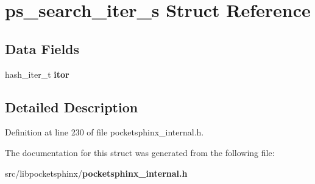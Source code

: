\section{ps\-\_\-search\-\_\-iter\-\_\-s Struct Reference}
\label{structps__search__iter__s}
\subsection*{Data Fields}
\begin{DoxyCompactItemize}
\item 
hash\-\_\-iter\-\_\-t {\bfseries itor}\label{structps__search__iter__s_a08c98d4145043af325263a80020758f7}

\end{DoxyCompactItemize}


\subsection{Detailed Description}


Definition at line 230 of file pocketsphinx\-\_\-internal.\-h.



The documentation for this struct was generated from the following file\-:\begin{DoxyCompactItemize}
\item 
src/libpocketsphinx/{\bf pocketsphinx\-\_\-internal.\-h}\end{DoxyCompactItemize}
